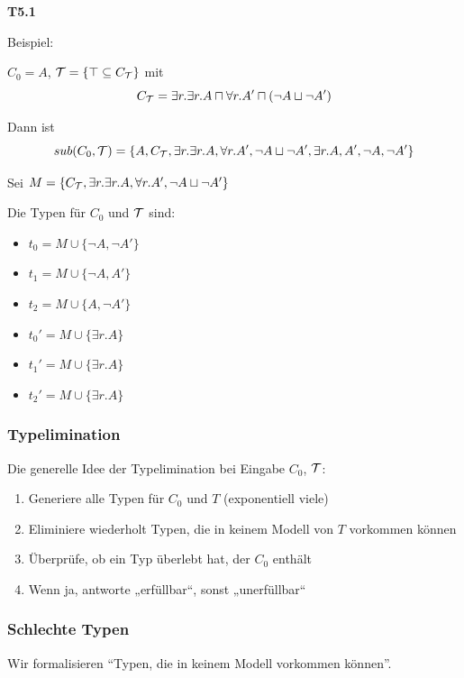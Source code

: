 \textbf{T5.1}

Beispiel:

$C_0 = A$, $\mathcal{T} = \{\top \subseteq C_{\mathcal{T}}\}$ mit $$C_{\mathcal{T}} = \exists r.\exists r.A \sqcap \forall r.A' \sqcap (\neg A \sqcup \neg A')$$

Dann ist $$sub(C_0, \mathcal{T}) = \{A, C_{\mathcal{T}}, \exists r.\exists r.A, \forall r.A',\neg A \sqcup \neg A', \exists r.A, A', \neg A, \neg A'\}$$

Sei $M = \{C_{\mathcal{T}}, \exists r.\exists r. A, \forall r.A', \neg A \sqcup \neg A'\}$

Die Typen für $C_0$ und $\mathcal{T}$ sind:

\begin{itemize}
  \item $t_0 = M \cup \{\neg A, \neg A'\}$
  \item $t_1 = M \cup \{\neg A, A'\}$
  \item $t_2 = M \cup \{A, \neg A'\}$
  \item $t_0' = M \cup \{\exists r.A\}$
  \item $t_1' = M \cup \{\exists r.A\}$
  \item $t_2' = M \cup \{\exists r.A\}$
\end{itemize}

\subsubsection{Typelimination}\label{typelimination}

Die generelle Idee der Typelimination bei Eingabe $C_0$, $\mathcal{T}$:

\begin{enumerate}
\def\labelenumi{\arabic{enumi}.}
\item
  Generiere alle Typen für $C_{0}$ und $T$ (exponentiell viele)
\item
  Eliminiere wiederholt Typen, die in keinem Modell von $T$ vorkommen
  können
\item
  Überprüfe, ob ein Typ überlebt hat, der $C_{0}$ enthält
\item
  Wenn ja, antworte „erfüllbar``, sonst „unerfüllbar``
\end{enumerate}

\subsubsection{Schlechte Typen}\label{schlechter-typ}

Wir formalisieren ``Typen, die in keinem Modell vorkommen können''.

